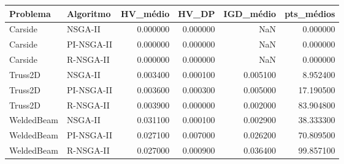 \begin{tabular}{llrrrr}
\toprule
Problema & Algoritmo & HV_médio & HV_DP & IGD_médio & pts_médios \\
\midrule
Carside & NSGA-II & 0.000000 & 0.000000 & NaN & 0.000000 \\
Carside & PI-NSGA-II & 0.000000 & 0.000000 & NaN & 0.000000 \\
Carside & R-NSGA-II & 0.000000 & 0.000000 & NaN & 0.000000 \\
Truss2D & NSGA-II & 0.003400 & 0.000100 & 0.005100 & 8.952400 \\
Truss2D & PI-NSGA-II & 0.003600 & 0.000300 & 0.005000 & 17.190500 \\
Truss2D & R-NSGA-II & 0.003900 & 0.000000 & 0.002000 & 83.904800 \\
WeldedBeam & NSGA-II & 0.031100 & 0.000100 & 0.002900 & 38.333300 \\
WeldedBeam & PI-NSGA-II & 0.027100 & 0.007000 & 0.026200 & 70.809500 \\
WeldedBeam & R-NSGA-II & 0.027000 & 0.000900 & 0.036400 & 99.857100 \\
\bottomrule
\end{tabular}
